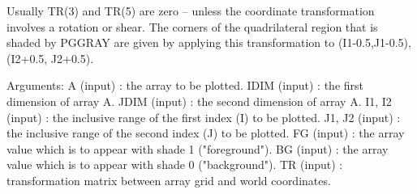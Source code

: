 {Usually TR(3) and TR(5) are zero -- unless the coordinate
transformation involves a rotation or shear.  The corners of the
quadrilateral region that is shaded by PGGRAY are given by
applying this transformation to (I1-0.5,J1-0.5), (I2+0.5, J2+0.5).
 
Arguments:
 A      (input)  : the array to be plotted.
 IDIM   (input)  : the first dimension of array A.
 JDIM   (input)  : the second dimension of array A.
 I1, I2 (input)  : the inclusive range of the first index
                   (I) to be plotted.
 J1, J2 (input)  : the inclusive range of the second
                   index (J) to be plotted.
 FG     (input)  : the array value which is to appear with shade
                   1 ("foreground").
 BG     (input)  : the array value which is to appear with shade
                   0 ("background").
 TR     (input)  : transformation matrix between array grid and
                   world coordinates.
\endtt}

